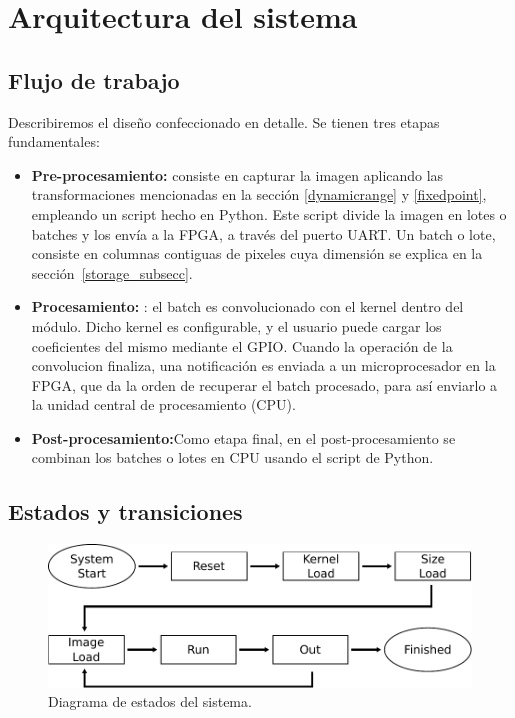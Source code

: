 \chapter{Arquitectura del sistema}  \label{arquitectura_sec}
\section{Flujo de trabajo}  \label{workflow_subsecc}

Describiremos el diseño confeccionado en detalle. Se tienen tres etapas fundamentales:

\begin{itemize}
\item \textbf{Pre-procesamiento:} consiste en capturar la imagen aplicando las
  transformaciones mencionadas en la sección \ref{dynamicrange} y
  \ref{fixedpoint}, empleando un script hecho en Python. Este script divide la
  imagen en lotes o batches y los envía a la FPGA, a través del puerto UART. Un
  batch o lote, consiste en columnas contiguas de pixeles cuya dimensión se
  explica en la sección~\ref{storage_subsecc}.
\item \textbf{Procesamiento:}	: el batch es convolucionado con el kernel dentro del módulo. Dicho kernel es configurable, y el usuario puede cargar los coeficientes del mismo mediante el GPIO. 
  Cuando la operación de la convolucion finaliza, una notificación es enviada a
  un microprocesador en la FPGA, que da la orden de recuperar el batch procesado, para así enviarlo a la unidad central de procesamiento (CPU).
\item \textbf{Post-procesamiento:}Como etapa final, en el post-procesamiento se combinan los batches o lotes en CPU usando el script de Python.
\end{itemize}

\section{Estados y transiciones}  \label{states_subsecc}

\begin{figure}
\centering
\includegraphics[scale=0.7]{states.pdf}
\caption{Diagrama de estados del sistema.}
\label{statesfig}
\end{figure}

